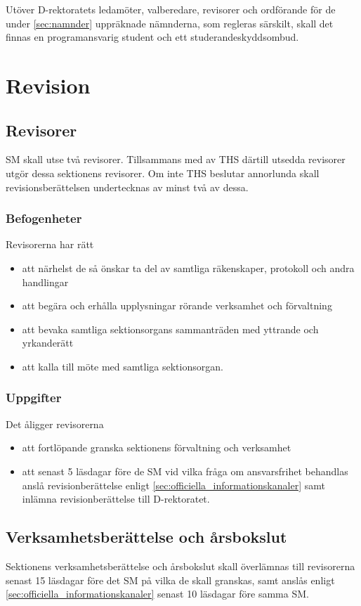 \documentclass[a4paper,12pt]{article}
\begin{document}
Utöver D-rektoratets ledamöter, valberedare, revisorer och ordförande för de under \ref{sec:namnder} uppräknade nämnderna, som regleras särskilt, skall det finnas en programansvarig student och ett studerandeskyddsombud.

\section{Revision}

\subsection{Revisorer}
\label{sec:revisorer}

SM skall utse två revisorer. Tillsammans med av THS därtill utsedda revisorer utgör dessa sektionens revisorer. Om inte THS beslutar annorlunda skall revisionsberättelsen undertecknas av minst två av dessa.

\subsubsection{Befogenheter}

Revisorerna har rätt

\begin{itemize}
  \item att närhelst de så önskar ta del av samtliga räkenskaper, protokoll och andra handlingar
  \item att begära och erhålla upplysningar rörande verksamhet och förvaltning
  \item att bevaka samtliga sektionsorgans sammanträden med yttrande och yrkanderätt
  \item att kalla till möte med samtliga sektionsorgan.
\end{itemize}

\subsubsection{Uppgifter}

Det åligger revisorerna

\begin{itemize}
  \item att fortlöpande granska sektionens förvaltning och verksamhet
  \item att senast 5 läsdagar före de SM vid vilka fråga om ansvarsfrihet behandlas anslå revisionberättelse enligt \ref{sec:officiella_informationskanaler} samt inlämna revisionberättelse till D-rektoratet.
\end{itemize}

\subsection{Verksamhetsberättelse och årsbokslut}

Sektionens verksamhetsberättelse och årsbokslut skall överlämnas till revisorerna senast 15 läsdagar före det SM på vilka de skall granskas, samt anslås enligt \ref{sec:officiella_informationskanaler} senast 10 läsdagar före samma SM.
\end{document}
